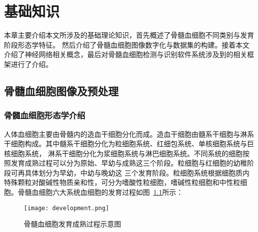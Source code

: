 
\chapter{基础知识}
本章主要介绍本文所涉及的基础理论知识，首先概述了骨髓血细胞不同类别与发育阶段形态学特征。
然后介绍了骨髓血细胞图像数字化与数据集的构建。接着本文介绍了神经网络相关概念，最后对骨髓血细胞检测与识别软件系统涉及到的相关框架进行了介绍。
\section{骨髓血细胞图像及预处理}
\subsection{骨髓血细胞形态学介绍}
人体血细胞主要由骨髓内的造血干细胞分化而成。造血干细胞由髓系干细胞与淋系干细胞构成。其中髓系干细胞分化为粒细胞系统、红细包系统、单核细胞系统与巨核细胞系统，
淋系干细胞分化为浆细胞系统与淋巴细胞系统。不同系统的细胞按照发育成熟过程可以分为原始、早幼与成熟这三个阶段。粒细胞与红细胞的幼稚阶段可再具体划分为早幼，中幼与晚幼这
三个发育阶段。粒细胞系统根据细胞质内特殊颗粒对酸碱性物质亲和性，可分为嗜酸性粒细胞，嗜碱性粒细胞和中性粒细胞。骨髓血细胞六大系统血细胞的发育过程如图~\ref{fig:development}所示：
\begin{figure}
  \centering
  \texttt{[image: development.png]}
  \caption{骨髓血细胞发育成熟过程示意图}
  \label{fig:development}
\end{figure}

